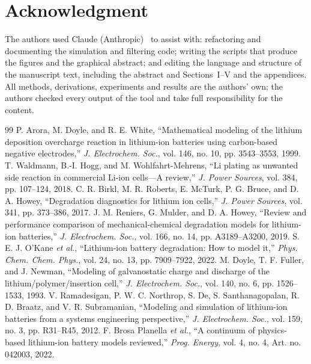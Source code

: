 \documentclass[journal]{IEEEtran}
\begin{document}
\section*{Acknowledgment}
The authors used Claude (Anthropic)~\cite{claude} to assist with: refactoring and documenting the simulation and filtering code; writing the scripts that produce the figures and the graphical abstract; and editing the language and structure of the manuscript text, including the abstract and Sections~I--V and the appendices. All methods, derivations, experiments and results are the authors' own; the authors checked every output of the tool and take full responsibility for the content.


\begin{thebibliography}{99}
 P. Arora, M. Doyle, and R. E. White, ``Mathematical modeling of the lithium deposition overcharge reaction in lithium-ion batteries using carbon-based negative electrodes,'' \emph{J. Electrochem. Soc.}, vol. 146, no. 10, pp. 3543--3553, 1999.
 T. Waldmann, B.-I. Hogg, and M. Wohlfahrt-Mehrens, ``Li plating as unwanted side reaction in commercial Li-ion cells---A review,'' \emph{J. Power Sources}, vol. 384, pp. 107--124, 2018.
 C. R. Birkl, M. R. Roberts, E. McTurk, P. G. Bruce, and D. A. Howey, ``Degradation diagnostics for lithium ion cells,'' \emph{J. Power Sources}, vol. 341, pp. 373--386, 2017.
 J. M. Reniers, G. Mulder, and D. A. Howey, ``Review and performance comparison of mechanical-chemical degradation models for lithium-ion batteries,'' \emph{J. Electrochem. Soc.}, vol. 166, no. 14, pp. A3189--A3200, 2019.
 S. E. J. O'Kane \emph{et al.}, ``Lithium-ion battery degradation: How to model it,'' \emph{Phys. Chem. Chem. Phys.}, vol. 24, no. 13, pp. 7909--7922, 2022.
 M. Doyle, T. F. Fuller, and J. Newman, ``Modeling of galvanostatic charge and discharge of the lithium/polymer/insertion cell,'' \emph{J. Electrochem. Soc.}, vol. 140, no. 6, pp. 1526--1533, 1993.
 V. Ramadesigan, P. W. C. Northrop, S. De, S. Santhanagopalan, R. D. Braatz, and V. R. Subramanian, ``Modeling and simulation of lithium-ion batteries from a systems engineering perspective,'' \emph{J. Electrochem. Soc.}, vol. 159, no. 3, pp. R31--R45, 2012.
 F. Brosa Planella \emph{et al.}, ``A continuum of physics-based lithium-ion battery models reviewed,'' \emph{Prog. Energy}, vol. 4, no. 4, Art. no. 042003, 2022.

\end{thebibliography}
\end{document}
